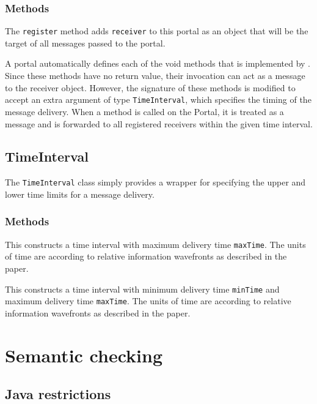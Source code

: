 \subsubsection{Methods}

  The {\tt register} method adds {\tt receiver} to this portal as an object that will be the target of all messages passed to the portal.

  A portal automatically defines each of the void methods that is implemented by {\tt <portal-type>}.  Since these methods have no return value, their invocation can act as a message to the receiver object.  However, the signature of these methods is modified to accept an extra argument of type {\tt TimeInterval}, which specifies the timing of the message delivery.  When a method is called on the Portal, it is treated as a message and is forwarded to all registered receivers within the given time interval.

\subsection{TimeInterval}

The {\tt TimeInterval} class simply provides a wrapper for specifying
the upper and lower time limits for a message delivery.

\subsubsection{Methods}

  This constructs a time interval with maximum delivery time {\tt maxTime}.  The units of time are according to relative information wavefronts as described in the paper.

  This constructs a time interval with minimum delivery time {\tt minTime} and maximum delivery time {\tt maxTime}.  The units of time are according to relative information wavefronts as described in the paper.

\section{Semantic checking}

\subsection{Java restrictions}
\label{sec:javarestrict}

